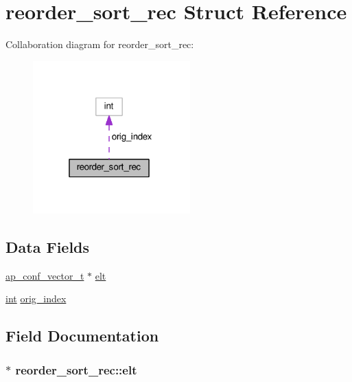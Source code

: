 \hypertarget{structreorder__sort__rec}{}\section{reorder\+\_\+sort\+\_\+rec Struct Reference}
\label{structreorder__sort__rec}


Collaboration diagram for reorder\+\_\+sort\+\_\+rec\+:
\nopagebreak
\begin{figure}[H]
\begin{center}
\leavevmode
\includegraphics[width=172pt]{structreorder__sort__rec__coll__graph}
\end{center}
\end{figure}
\subsection*{Data Fields}
\begin{DoxyCompactItemize}
\item 
\hyperlink{group__APACHE__CORE__CONFIG_ga614684670dbf748a70ac6bad272da59c}{ap\+\_\+conf\+\_\+vector\+\_\+t} $\ast$ \hyperlink{structreorder__sort__rec_a03c45772bd657334bb1f5fac33d1a5f8}{elt}
\item 
\hyperlink{pcre_8txt_a42dfa4ff673c82d8efe7144098fbc198}{int} \hyperlink{structreorder__sort__rec_a374f0efc9b321a5d6cb2db016e55aca9}{orig\+\_\+index}
\end{DoxyCompactItemize}


\subsection{Field Documentation}
\subsubsection[{\texorpdfstring{elt}{elt}}]{$\ast$ reorder\+\_\+sort\+\_\+rec\+::elt}\hypertarget{structreorder__sort__rec_a03c45772bd657334bb1f5fac33d1a5f8}{}\label{structreorder__sort__rec_a03c45772bd657334bb1f5fac33d1a5f8}
